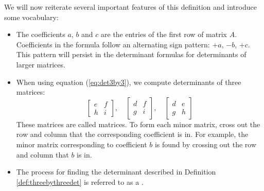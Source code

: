 \documentclass{ximera}
\begin{document}
We will now reiterate several important features of this definition and introduce some vocabulary:
\begin{itemize}
\item The coefficients $a$, $b$ and $c$ are the entries of the first row of matrix $A$.  Coefficients in the formula follow an alternating sign pattern: $+a$, $-b$, $+c$.  This pattern will persist in the determinant formulas for determinants of larger matrices.
\item When using equation (\ref{eq:det3by3}), we compute determinants of three matrices:
$$\begin{bmatrix}e&f\\h&i\end{bmatrix},\quad \begin{bmatrix}d&f\\g&i\end{bmatrix},\quad \begin{bmatrix}d&e\\g&h\end{bmatrix}$$
These matrices are called  matrices.  To form each minor matrix,
cross out the row and column that the corresponding coefficient is in.  For example, the minor matrix corresponding to coefficient $b$ is found by crossing out the row and column that $b$ is in.
\begin{center}
 \end{center} 
 \item The process for finding the determinant described in Definition \ref{def:threebythreedet} is referred to as a . %
\end{itemize}
\end{document}
